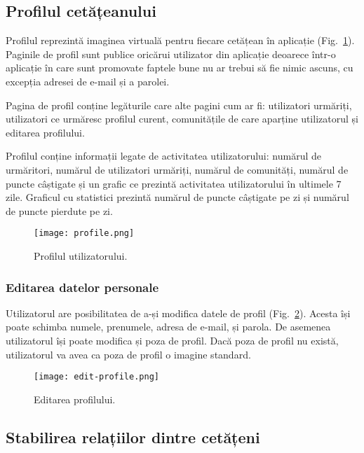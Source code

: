 \subsection{Profilul cetățeanului}

    Profilul reprezintă imaginea virtuală pentru fiecare cetățean în aplicație (Fig.~\ref{fig:profile}). Paginile de profil
    sunt publice oricărui utilizator din aplicație deoarece într-o aplicație în care sunt promovate faptele bune nu
    ar trebui să fie nimic ascuns, cu excepția adresei de e-mail și a parolei.

    Pagina de profil conține legăturile care alte pagini cum ar fi: utilizatori urmăriți, utilizatori ce urmăresc profilul curent, 
    comunitățile de care aparține utilizatorul și editarea profilului.

    Profilul conține informații legate de activitatea utilizatorului: numărul de urmăritori, 
    numărul de utilizatori urmăriți, numărul de comunități, numărul de puncte câștigate și un grafic ce prezintă activitatea 
    utilizatorului în ultimele 7 zile. Graficul cu statistici prezintă numărul de puncte câștigate pe zi și numărul 
    de puncte pierdute pe zi.
    \begin{figure}[h]
    \texttt{[image: profile.png]}
    \centering
    \caption{Profilul utilizatorului.}
    \label{fig:profile}
    \end{figure} 
\subsubsection{Editarea datelor personale}

    Utilizatorul are posibilitatea de a-și modifica datele de profil (Fig.~\ref{fig:edit-profile}). Acesta își poate schimba numele, prenumele, adresa de e-mail, 
    și parola. De asemenea utilizatorul își poate modifica și poza de profil. Dacă poza de profil nu există, utilizatorul va avea
    ca poza de profil o imagine standard.
    \begin{figure}[h]
    \texttt{[image: edit-profile.png]}
    \centering
    \caption{Editarea profilului.}
    \label{fig:edit-profile}
    \end{figure} 

\subsection{Stabilirea relațiilor dintre cetățeni}
    
